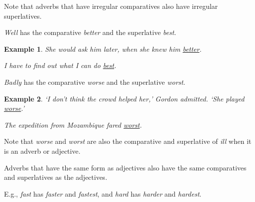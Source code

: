 \documentclass[oneside]{book}
\numberwithin{equation}{section}
\newtheorem{example}{Example}[section]
\begin{document}
Note that adverbs that have irregular comparatives also have irregular superlatives.

%
\textit{Well} has the comparative \textit{better} and the superlative \textit{best}.
\begin{example}
    She would ask him later, when she knew him \underline{better}.
    
    I have to find out what I can do \underline{best}.
\end{example}
\textit{Badly} has the comparative \textit{worse} and the superlative \textit{worst}.
\begin{example}
    `I don't think the crowd helped her,' Gordon admitted. `She played \underline{worse}.'
    
    The expedition from Mozambique fared \underline{worst}.
\end{example}
Note that \textit{worse} and \textit{worst} are also the comparative and superlative of \textit{ill} when it is an adverb or adjective.

%
\noindent{} Adverbs that have the same form as adjectives also have the same comparatives and superlatives as the adjectives.

E.g., \textit{fast} has \textit{faster} and \textit{fastest}, and \textit{hard} has \textit{harder} and \textit{hardest}.
\end{document}
